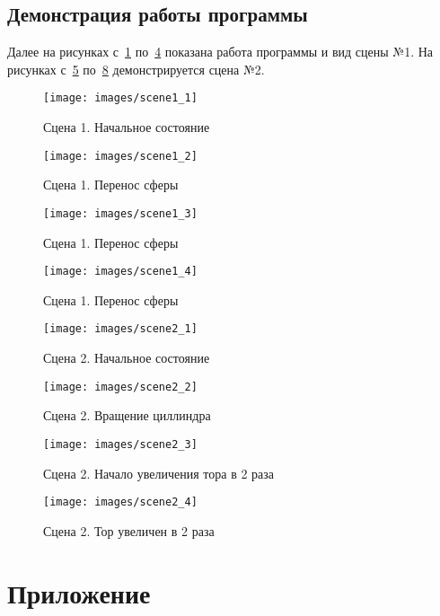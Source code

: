 \documentclass[14pt, final]{extarticle}
\begin{document}
\subsection{Демонстрация работы программы}

Далее на рисунках с \,\ref{scene11_figure} по \,\ref{scene14_figure} показана работа
программы и вид сцены №1.
На рисунках с \,\ref{scene21_figure} по \,\ref{scene24_figure} демонстрируется сцена №2.

\begin{figure}[h]
    \texttt{[image: images/scene1\_1]}
    \caption{Сцена 1. Начальное состояние}
    \label{scene11_figure}
\end{figure}
\begin{figure}[h!]
    \texttt{[image: images/scene1\_2]}
    \caption{Сцена 1. Перенос сферы}
    \label{scene12_figure}
\end{figure}
\begin{figure}[h!]
    \texttt{[image: images/scene1\_3]}
    \caption{Сцена 1. Перенос сферы}
    \label{scene13_figure}
\end{figure}
\begin{figure}[h!]
    \texttt{[image: images/scene1\_4]}
    \caption{Сцена 1. Перенос сферы}
    \label{scene14_figure}
\end{figure}

\begin{figure}[h!]
    \texttt{[image: images/scene2\_1]}
    \caption{Сцена 2. Начальное состояние}
    \label{scene21_figure}
\end{figure}
\begin{figure}[h!]
    \texttt{[image: images/scene2\_2]}
    \caption{Сцена 2. Вращение циллиндра}
    \label{scene22_figure}
\end{figure}
\begin{figure}[h!]
    \texttt{[image: images/scene2\_3]}
    \caption{Сцена 2. Начало увеличения тора в 2 раза}
    \label{scene23_figure}
\end{figure}
\begin{figure}[h!]
    \texttt{[image: images/scene2\_4]}
    \caption{Сцена 2. Тор увеличен в 2 раза}
    \label{scene24_figure}
\end{figure}

\newpage
\section*{Приложение}


\end{document}
